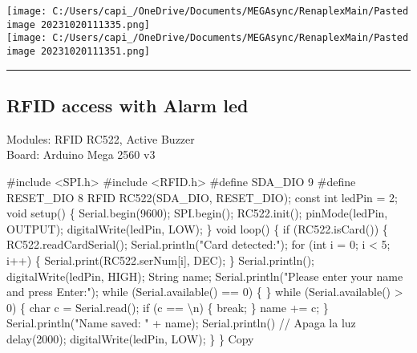 \documentclass[
]{article}
\newenvironment{Shaded}{}{}
\newcommand{\NormalTok}[1]{#1}
\begin{document}
\texttt{[image: C:/Users/capi\_/OneDrive/Documents/MEGAsync/RenaplexMain/Pasted image 20231020111335.png]}\\
\texttt{[image: C:/Users/capi\_/OneDrive/Documents/MEGAsync/RenaplexMain/Pasted image 20231020111351.png]}

\begin{center}\rule{0.5\linewidth}{0.5pt}\end{center}

\subsection{RFID access with Alarm
led}\label{rfid-access-with-alarm-led}

Modules: RFID RC522, Active Buzzer\\
Board: Arduino Mega 2560 v3

\begin{Shaded}
\begin{Highlighting}[]
\NormalTok{\#include \textless{}SPI.h\textgreater{}}
\NormalTok{\#include \textless{}RFID.h\textgreater{}}
\NormalTok{\#define SDA\_DIO 9}
\NormalTok{\#define RESET\_DIO 8}
\NormalTok{RFID RC522(SDA\_DIO, RESET\_DIO);}
\NormalTok{const int ledPin = 2;}
\NormalTok{void setup()}
\NormalTok{\{}
\NormalTok{  Serial.begin(9600);}
\NormalTok{  SPI.begin();}
\NormalTok{  RC522.init();}
\NormalTok{  pinMode(ledPin, OUTPUT);}
\NormalTok{  digitalWrite(ledPin, LOW);}
\NormalTok{\}}
\NormalTok{void loop()}
\NormalTok{\{}
\NormalTok{  if (RC522.isCard())}
\NormalTok{  \{}
\NormalTok{    RC522.readCardSerial();}
\NormalTok{    Serial.println("Card detected:");}
\NormalTok{    for (int i = 0; i \textless{} 5; i++)}
\NormalTok{    \{}
\NormalTok{      Serial.print(RC522.serNum[i], DEC);}
\NormalTok{    \}}
\NormalTok{    Serial.println();}
\NormalTok{    digitalWrite(ledPin, HIGH);}
\NormalTok{    String name;}
\NormalTok{    Serial.println("Please enter your name and press Enter:");}
\NormalTok{    while (Serial.available() == 0)}
\NormalTok{    \{}
\NormalTok{    \}}
\NormalTok{    while (Serial.available() \textgreater{} 0)}
\NormalTok{    \{}
\NormalTok{      char c = Serial.read();}
\NormalTok{      if (c == \textquotesingle{}\textbackslash{}n\textquotesingle{})}
\NormalTok{      \{}
\NormalTok{        break;}
\NormalTok{      \}}
\NormalTok{      name += c;}
\NormalTok{    \}}
\NormalTok{    Serial.println("Name saved: " + name);}
\NormalTok{    Serial.println()}
\NormalTok{    // Apaga la luz}
\NormalTok{    delay(2000);}
\NormalTok{    digitalWrite(ledPin, LOW);}
\NormalTok{  \}}
\NormalTok{\}}
\NormalTok{Copy}
\end{Highlighting}
\end{Shaded}
\end{document}
